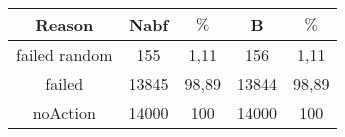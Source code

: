 \documentclass{article}
\begin{document}
\begin{tabular}{|c||c|c||c|c|}
\hline
Reason&Nabf& $\%$&B& $\%$\\
\hline
failed random&155&1,11&156&1,11\\

failed&13845&98,89&13844&98,89\\

noAction&14000&100&14000&100\\
\hline
\end{tabular}
\end{document}
